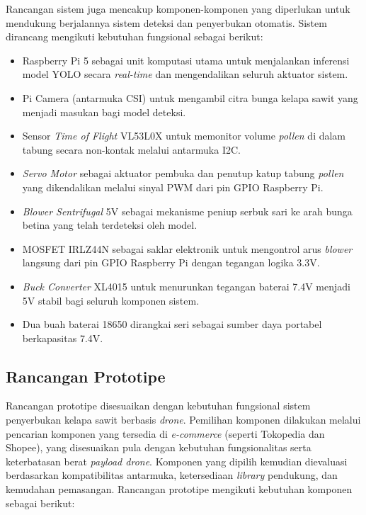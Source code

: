 Rancangan sistem juga mencakup komponen-komponen yang diperlukan untuk mendukung berjalannya sistem deteksi dan penyerbukan otomatis. Sistem dirancang mengikuti kebutuhan fungsional sebagai berikut:

\begin{itemize}
    \item Raspberry Pi 5 sebagai unit komputasi utama untuk menjalankan inferensi model YOLO secara \emph{real-time} dan mengendalikan seluruh aktuator sistem.
    \item Pi Camera (antarmuka CSI) untuk mengambil citra bunga kelapa sawit yang menjadi masukan bagi model deteksi.
    \item Sensor \emph{Time of Flight} VL53L0X untuk memonitor volume \emph{pollen} di dalam tabung secara non-kontak melalui antarmuka I2C.
    \item \emph{Servo Motor} sebagai aktuator pembuka dan penutup katup tabung \emph{pollen} yang dikendalikan melalui sinyal PWM dari pin GPIO Raspberry Pi.
    \item \emph{Blower Sentrifugal} 5V sebagai mekanisme peniup serbuk sari ke arah bunga betina yang telah terdeteksi oleh model.
    \item MOSFET IRLZ44N sebagai saklar elektronik untuk mengontrol arus \emph{blower} langsung dari pin GPIO Raspberry Pi dengan tegangan logika 3.3V.
    \item \emph{Buck Converter} XL4015 untuk menurunkan tegangan baterai 7.4V menjadi 5V stabil bagi seluruh komponen sistem.
    \item Dua buah baterai 18650 dirangkai seri sebagai sumber daya portabel berkapasitas 7.4V.
\end{itemize}


\subsection{Rancangan Prototipe}
\label{subsec:rancangan-prototipe}

Rancangan prototipe disesuaikan dengan kebutuhan fungsional sistem penyerbukan kelapa sawit berbasis \emph{drone}. Pemilihan komponen dilakukan melalui pencarian komponen yang tersedia di \emph{e-commerce} (seperti Tokopedia dan Shopee), yang disesuaikan pula dengan kebutuhan fungsionalitas serta keterbatasan berat \emph{payload drone}. Komponen yang dipilih kemudian dievaluasi berdasarkan kompatibilitas antarmuka, ketersediaan \emph{library} pendukung, dan kemudahan pemasangan. Rancangan prototipe mengikuti kebutuhan komponen sebagai berikut:

